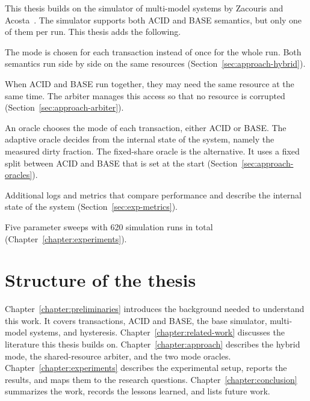 This thesis builds on the simulator of multi-model systems by Zacouris and
Acosta~\cite{zacouris2025m2ts,zacouris2026mxs}. The simulator supports both ACID
and BASE semantics, but only one of them per run. This thesis adds the
following.

\begin{bullets}
  \item[A hybrid execution mode.] The mode is chosen for each transaction
  instead of once for the whole run. Both semantics run side by side on the same
  resources (Section~\ref{sec:approach-hybrid}).

  \item[A shared-resource arbiter.] When ACID and BASE run together, they may
  need the same resource at the same time. The arbiter manages this access so
  that no resource is corrupted (Section~\ref{sec:approach-arbiter}).

  \item[Two mode oracles.] An oracle chooses the mode of each transaction,
  either ACID or BASE. The adaptive oracle decides from the internal state of
  the system, namely the measured dirty fraction. The fixed-share oracle is
  the alternative. It uses a fixed split between ACID and BASE that is set at
  the start (Section~\ref{sec:approach-oracles}).

  \item[Metrics for hybrid runs.] Additional logs and metrics that compare
  performance and describe the internal state of the system
  (Section~\ref{sec:exp-metrics}).

  \item[An empirical evaluation.] Five parameter sweeps with 620 simulation runs
  in total (Chapter~\ref{chapter:experiments}).
\end{bullets}


\section{Structure of the thesis}\label{sec:intro-structure}

Chapter~\ref{chapter:preliminaries} introduces the background needed to
understand this work. It covers transactions, ACID and BASE, the base simulator,
multi-model systems, and hysteresis.
Chapter~\ref{chapter:related-work} discusses the literature this thesis builds
on. Chapter~\ref{chapter:approach} describes the hybrid mode, the
shared-resource arbiter, and the two mode oracles.
Chapter~\ref{chapter:experiments} describes the experimental setup, reports the
results, and maps them to the research questions.
Chapter~\ref{chapter:conclusion} summarizes the work, records the
lessons learned, and lists future work.
